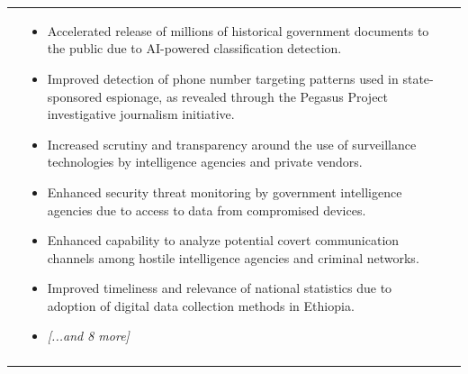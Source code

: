 \begin{longtable}{p{5.2cm}|p{5.2cm}|p{5.2cm}}
\begin{itemize}[leftmargin=*, nosep, before=\vspace{-0.5\baselineskip}, after=\vspace{-0.5\baselineskip}]
\end{itemize} & \begin{itemize}[leftmargin=*, nosep, before=\vspace{-0.5\baselineskip}, after=\vspace{-0.5\baselineskip}] 
\footnotesize
\item Accelerated release of millions of historical government documents to the public due to AI-powered classification detection.
\item Improved detection of phone number targeting patterns used in state-sponsored espionage, as revealed through the Pegasus Project investigative journalism initiative.
\item Increased scrutiny and transparency around the use of surveillance technologies by intelligence agencies and private vendors.
\item Enhanced security threat monitoring by government intelligence agencies due to access to data from compromised devices.
\item Enhanced capability to analyze potential covert communication channels among hostile intelligence agencies and criminal networks.
\item Improved timeliness and relevance of national statistics due to adoption of digital data collection methods in Ethiopia.
\item \textit{[...and 8 more]}
\end{itemize} \\
\pagebreak
\end{longtable}
